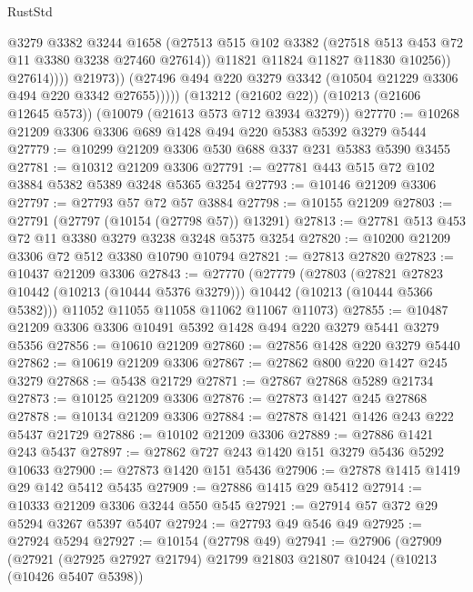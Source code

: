 \begin{lexlean}{RustStd}
\begin{coremodule}
{\begin{coremodule}
{{{{{{{{{{{{{{{{{{{{{{{{{{                          @3279
                          @3382
                          @3244
                          @1658
                          (@27513
                            @515
                            @102
                            @3382
                            (@27518 @513 @453 @72 @11 @3380 @3238 @27460 @27614))
                          @11821
                          @11824
                          @11827
                          @11830
                          @10256))
                      @27614))))
              @21973))
          (@27496 @494 @220 @3279 @3342 (@10504 @21229 @3306 @494 @220 @3342 @27655)))))
    (@13212 (@21602 @22))
    (@10213 (@21606 @12645 @573))
    (@10079 (@21613 @573 @712 @3934 @3279))
@27770 := @10268 @21209 @3306 @3306 @689 @1428 @494 @220 @5383 @5392 @3279 @5444
@27779 := @10299 @21209 @3306 @530 @688 @337 @231 @5383 @5390 @3455
@27781 := @10312 @21209 @3306
@27791 := @27781 @443 @515 @72 @102 @3884 @5382 @5389 @3248 @5365 @3254
@27793 := @10146 @21209 @3306
@27797 := @27793 @57 @72 @57 @3884
@27798 := @10155 @21209
@27803 := @27791 (@27797 (@10154 (@27798 @57)) @13291)
@27813 := @27781 @513 @453 @72 @11 @3380 @3279 @3238 @3248 @5375 @3254
@27820 := @10200 @21209 @3306 @72 @512 @3380 @10790 @10794
@27821 := @27813 @27820
@27823 := @10437 @21209 @3306
@27843 := @27770
    (@27779
      (@27803
        (@27821 @27823 @10442 (@10213 (@10444 @5376 @3279)))
        @10442
        (@10213 (@10444 @5366 @5382)))
      @11052
      @11055
      @11058
      @11062
      @11067
      @11073)
@27855 := @10487 @21209 @3306 @3306 @10491 @5392 @1428 @494 @220 @3279 @5441 @3279 @5356
@27856 := @10610 @21209
@27860 := @27856 @1428 @220 @3279 @5440
@27862 := @10619 @21209 @3306
@27867 := @27862 @800 @220 @1427 @245 @3279
@27868 := @5438 @21729
@27871 := @27867 @27868 @5289 @21734
@27873 := @10125 @21209 @3306
@27876 := @27873 @1427 @245 @27868
@27878 := @10134 @21209 @3306
@27884 := @27878 @1421 @1426 @243 @222 @5437 @21729
@27886 := @10102 @21209 @3306
@27889 := @27886 @1421 @243 @5437
@27897 := @27862 @727 @243 @1420 @151 @3279 @5436 @5292 @10633
@27900 := @27873 @1420 @151 @5436
@27906 := @27878 @1415 @1419 @29 @142 @5412 @5435
@27909 := @27886 @1415 @29 @5412
@27914 := @10333 @21209 @3306 @3244 @550 @545
@27921 := @27914 @57 @372 @29 @5294 @3267 @5397 @5407
@27924 := @27793 @49 @546 @49
@27925 := @27924 @5294
@27927 := @10154 (@27798 @49)
@27941 := @27906
    (@27909
      (@27921
        (@27925 @27927 @21794)
        @21799
        @21803
        @21807
        @10424
        (@10213 (@10426 @5407 @5398))
}}}}}}}}}}}}}}}}}}}}}}}}}}
\end{coremodule}}
\end{coremodule}
\end{lexlean}
